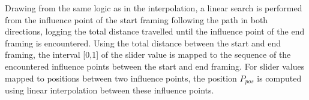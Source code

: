 Drawing from the same logic as in the interpolation, a linear search is performed from the influence point of the start framing following the path in both directions, logging the total distance travelled until the influence point of the end framing is encountered. Using the total distance between the start and end framing, the interval [0,1] of the slider value is mapped to the sequence of the encountered influence points between the start and end framing. For slider values mapped to positions between two influence points, the position $P_{pos}$ is computed using linear interpolation between these influence points.

